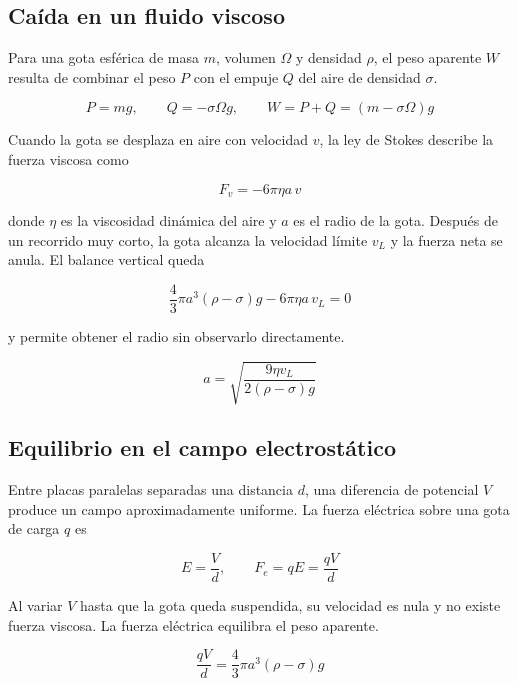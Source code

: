 \documentclass{article}
\begin{document}
\subsection{Caída en un fluido viscoso}

Para una gota esférica de masa $m$, volumen $\Omega$ y densidad $\rho$, el peso aparente $W$ resulta de combinar el peso $P$ con el empuje $Q$ del aire de densidad $\sigma$.

\begin{equation}
P=mg,\qquad Q=-\sigma\Omega g,\qquad W=P+Q=(m-\sigma\Omega)g
\end{equation}

Cuando la gota se desplaza en aire con velocidad $v$, la ley de Stokes describe la fuerza viscosa como

\begin{equation}
F_v=-6\pi\eta a\,v
\end{equation}

donde $\eta$ es la viscosidad dinámica del aire y $a$ es el radio de la gota. Después de un recorrido muy corto, la gota alcanza la velocidad límite $v_L$ y la fuerza neta se anula. El balance vertical queda

\begin{equation}
\frac{4}{3}\pi a^3(\rho-\sigma)g-6\pi\eta a\,v_L=0
\end{equation}

y permite obtener el radio sin observarlo directamente.

\begin{equation}
a=\sqrt{\frac{9\eta v_L}{2(\rho-\sigma)g}}
\end{equation}

\subsection{Equilibrio en el campo electrostático}

Entre placas paralelas separadas una distancia $d$, una diferencia de potencial $V$ produce un campo aproximadamente uniforme. La fuerza eléctrica sobre una gota de carga $q$ es

\begin{equation}
E=\frac{V}{d},\qquad F_e=qE=\frac{qV}{d}
\end{equation}

Al variar $V$ hasta que la gota queda suspendida, su velocidad es nula y no existe fuerza viscosa. La fuerza eléctrica equilibra el peso aparente.

\begin{equation}
\frac{qV}{d}=\frac{4}{3}\pi a^3(\rho-\sigma)g
\end{equation}
\end{document}
